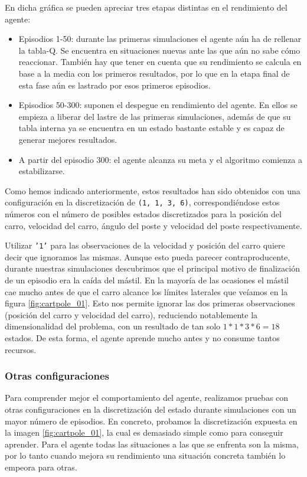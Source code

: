 En dicha gráfica se pueden apreciar tres etapas distintas en el rendimiento del agente:
\begin{itemize}
    \item Episodios 1-50: durante las primeras simulaciones el agente aún ha de rellenar la tabla-Q. Se encuentra en situaciones nuevas ante las que aún no sabe cómo reaccionar. También hay que tener en cuenta que su rendimiento se calcula en base a la media con los primeros resultados, por lo que en la etapa final de esta fase aún es lastrado por esos primeros episodios.
    \item Episodios 50-300: suponen el despegue en rendimiento del agente. En ellos se empieza a liberar del lastre de las primeras simulaciones, además de que su tabla interna ya se encuentra en un estado bastante estable y es capaz de generar mejores resultados.
    \item A partir del episodio 300: el agente alcanza su meta y el algoritmo comienza a estabilizarse.
\end{itemize}

Como hemos indicado anteriormente, estos resultados han sido obtenidos con una configuración en la discretización de \texttt{(1, 1, 3, 6)}, correspondiéndose estos números con el número de posibles estados discretizados para la posición del carro, velocidad del carro, ángulo del poste y velocidad del poste respectivamente. 

Utilizar \texttt{'1'} para las observaciones de la velocidad y posición del carro quiere decir que ignoramos las mismas. Aunque esto pueda parecer contraproducente, durante nuestras simulaciones descubrimos que el principal motivo de finalización de un episodio era la caída del mástil. En la mayoría de las ocasiones el mástil cae mucho antes de que el carro alcance los límites laterales que veíamos en la figura \ref{fig:cartpole_01}. Esto nos permite ignorar las dos primeras observaciones (posición del carro y velocidad del carro), reduciendo notablemente la dimensionalidad del problema, con un resultado de tan solo $1*1*3*6=18$ estados. De esta forma, el agente aprende mucho antes y no consume tantos recursos.


\subsubsection{Otras configuraciones}

Para comprender mejor el comportamiento del agente, realizamos pruebas con otras configuraciones en la discretización del estado durante simulaciones con un mayor número de episodios. En concreto, probamos la discretización expuesta en la imagen \ref{fig:cartpole_01}, la cual es demasiado simple como para conseguir aprender. Para el agente todas las situaciones a las que se enfrenta son la misma, por lo tanto cuando mejora su rendimiento una situación concreta también lo empeora para otras.

